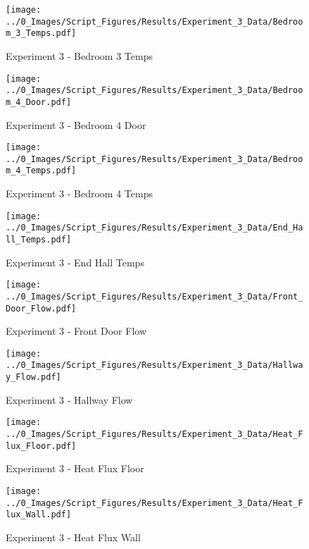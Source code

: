 	\begin{figure}[H]
		\centering
		\texttt{[image: ../0\_Images/Script\_Figures/Results/Experiment\_3\_Data/Bedroom\_3\_Temps.pdf]}
		\caption[]{Experiment 3 - Bedroom 3 Temps}
	\end{figure}
 
	\clearpage

	\begin{figure}[H]
		\centering
		\texttt{[image: ../0\_Images/Script\_Figures/Results/Experiment\_3\_Data/Bedroom\_4\_Door.pdf]}
		\caption[]{Experiment 3 - Bedroom 4 Door}
	\end{figure}
 

	\begin{figure}[H]
		\centering
		\texttt{[image: ../0\_Images/Script\_Figures/Results/Experiment\_3\_Data/Bedroom\_4\_Temps.pdf]}
		\caption[]{Experiment 3 - Bedroom 4 Temps}
	\end{figure}
 
	\clearpage

	\begin{figure}[H]
		\centering
		\texttt{[image: ../0\_Images/Script\_Figures/Results/Experiment\_3\_Data/End\_Hall\_Temps.pdf]}
		\caption[]{Experiment 3 - End Hall Temps}
	\end{figure}
 

	\begin{figure}[H]
		\centering
		\texttt{[image: ../0\_Images/Script\_Figures/Results/Experiment\_3\_Data/Front\_Door\_Flow.pdf]}
		\caption[]{Experiment 3 - Front Door Flow}
	\end{figure}
 
	\clearpage

	\begin{figure}[H]
		\centering
		\texttt{[image: ../0\_Images/Script\_Figures/Results/Experiment\_3\_Data/Hallway\_Flow.pdf]}
		\caption[]{Experiment 3 - Hallway Flow}
	\end{figure}
 

	\begin{figure}[H]
		\centering
		\texttt{[image: ../0\_Images/Script\_Figures/Results/Experiment\_3\_Data/Heat\_Flux\_Floor.pdf]}
		\caption[]{Experiment 3 - Heat Flux Floor}
	\end{figure}
 
	\clearpage

	\begin{figure}[H]
		\centering
		\texttt{[image: ../0\_Images/Script\_Figures/Results/Experiment\_3\_Data/Heat\_Flux\_Wall.pdf]}
		\caption[]{Experiment 3 - Heat Flux Wall}
	\end{figure}
 

